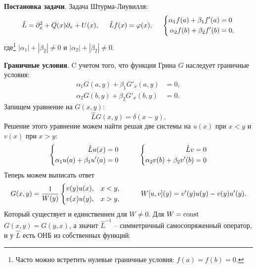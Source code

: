 
\textbf{Постановка задачи}. 
Задача Штурма-Лиувилля:
\begin{equation}
    \hat{L} = \partial_x^2 + Q(x) \partial_x + U(x),
    \hspace{5 mm} 
    \hat{L} f(x) = \varphi(x),
    \hspace{5 mm} 
    \left\{\begin{aligned}
        \alpha_1 f(a) + \beta_1 f'(a) &= 0 \\
        \alpha_2 f(b) + \beta_2 f'(b) &= 0,
    \end{aligned}\right.
\end{equation}
где\footnote{
    Часто можно встретить нулевые граничные условия: $f(a) = f(b) = 0$. 
}  $|\alpha_1| + |\beta_2| \neq 0$ и $|\alpha_2| + |\beta_2| \neq 0$.

\textbf{Граничные условия}.  C учетом того, что функция Грина $G$ наследует граничные условия:
\begin{align*}
    \alpha_1 G(a, y) + \beta_1 G'_x (a, y) &= 0, \\
    \alpha_2 G(b, y) + \beta_2 G'_x (b, y) &= 0.
\end{align*}
Запищем уравнение на $G(x, y)$:
\begin{equation*}
    \hat{L} G(x, y) = \delta(x-y).
\end{equation*}
Решение этого уравнение можем найти решая две системы на $u(x)$ при $x < y$ и $v(x)$ при $x > y$:
\begin{equation*}
\left\{\begin{aligned}
        \hat{L} u(x) &= 0 \\
        \alpha_1 u(a) + \beta_1 u'(a) &= 0
    \end{aligned}\right.
    \hspace{10 mm} 
    \left\{\begin{aligned}
        \hat{L} v &= 0 \\
        \alpha_2 v(b) + \beta_2 v'(b) &= 0
    \end{aligned}\right.
\end{equation*}
Теперь можем выписать ответ
\begin{equation}
    G(x, y) = \frac{1}{W(y)} \left\{\begin{aligned}
        &v(y) u(x), &x < y, \\
        &v(x) u(y), &x > y,
    \end{aligned}\right.
    \hspace{10 mm} 
    W[u, v](y) = v' (y) u(y) - v(y) u'(y).
\end{equation}
Который существует и единственнен для $W \neq 0$. Для $W = \textnormal{const} $ $G(x, y) = G(y, x)$, а значит $\hat{L}^{-1}$ -- симметричный самосопряженный оператор, и у $\hat{L}$ есть ОНБ из собственных функций. 


